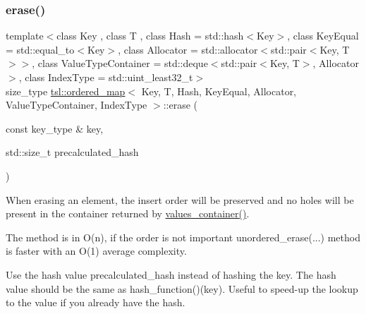 \subsubsection{\texorpdfstring{erase()}{erase()}\hspace{0.1cm}{\footnotesize\ttfamily [5/7]}}
{\footnotesize\ttfamily template$<$class Key , class T , class Hash  = std\+::hash$<$\+Key$>$, class Key\+Equal  = std\+::equal\+\_\+to$<$\+Key$>$, class Allocator  = std\+::allocator$<$std\+::pair$<$\+Key, T$>$$>$, class Value\+Type\+Container  = std\+::deque$<$std\+::pair$<$\+Key, T$>$, Allocator$>$, class Index\+Type  = std\+::uint\+\_\+least32\+\_\+t$>$ \\
size\+\_\+type \mbox{\hyperlink{classtsl_1_1ordered__map}{tsl\+::ordered\+\_\+map}}$<$ Key, T, Hash, Key\+Equal, Allocator, Value\+Type\+Container, Index\+Type $>$\+::erase (\begin{DoxyParamCaption}\item[{const key\+\_\+type \&}]{key,  }\item[{std\+::size\+\_\+t}]{precalculated\+\_\+hash }\end{DoxyParamCaption})\hspace{0.3cm}{\ttfamily [inline]}}





When erasing an element, the insert order will be preserved and no holes will be present in the container returned by \textquotesingle{}\mbox{\hyperlink{classtsl_1_1ordered__map_abb69bca0a80def48ae806078d77175cb}{values\+\_\+container()}}\textquotesingle{}.

The method is in O(n), if the order is not important \textquotesingle{}unordered\+\_\+erase(...)\textquotesingle{} method is faster with an O(1) average complexity.

Use the hash value \textquotesingle{}precalculated\+\_\+hash\textquotesingle{} instead of hashing the key. The hash value should be the same as hash\+\_\+function()(key). Useful to speed-\/up the lookup to the value if you already have the hash. \mbox{\label{classtsl_1_1ordered__map_aad75297e1383569fbf7b6288ed9ebe4d}} 

